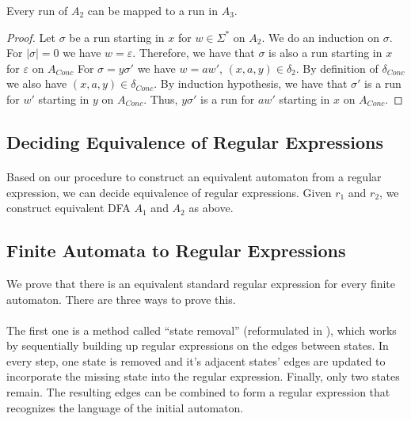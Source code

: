 \begin{lemma}
    \label{dfa_conc_cont}
    Every run of $A_2$ can be mapped to a run in $A_3$.
\end{lemma}
\begin{proof}
    Let $\sigma$ be a run starting in $x$ for $w \in \Sigma^*$ on $A_2$.
    We do an induction on $\sigma$.
    For $|\sigma| = 0$%
    we have $w = \varepsilon$.
    Therefore, we have that $\sigma$ is also a run starting in $x$ for $\varepsilon$ on $A_{Conc}$
    For $\sigma = y\sigma'$ we have $w = aw'$, $(x, a, y) \in \delta_2$.
    By definition of $\delta_{Conc}$ we also have $(x, a, y) \in \delta_{Conc}$.
    By induction hypothesis, we have that $\sigma'$ is a run for $w'$ starting in $y$ on $A_{Conc}$.
    Thus, $y\sigma'$ is a run for $aw'$ starting in $x$ on $A_{Conc}$.
\end{proof}


\subsection{Deciding Equivalence of Regular Expressions}

\paragraph{} 
Based on our procedure to construct an equivalent automaton from a regular expression, we can decide equivalence of regular expressions. Given $r_1$ and $r_2$, we construct equivalent DFA $A_1$ and $A_2$ as above.


\subsection{Finite Automata to Regular Expressions}
We prove that there is an equivalent standard regular expression for every finite automaton.
There are three ways to prove this. 

\paragraph{}
The first one is a method called ``state removal'' \cite{SignalFlow} (reformulated in \cite{springerlink:10.1007/978-3-540-30500-2}),
which works by sequentially building up regular expressions on the edges between states. 
In every step, one state is removed and it's adjacent states' edges are updated to incorporate the missing state into the regular expression.
Finally, only two states remain. The resulting edges can be combined to form a regular expression that recognizes the language of the initial automaton.


